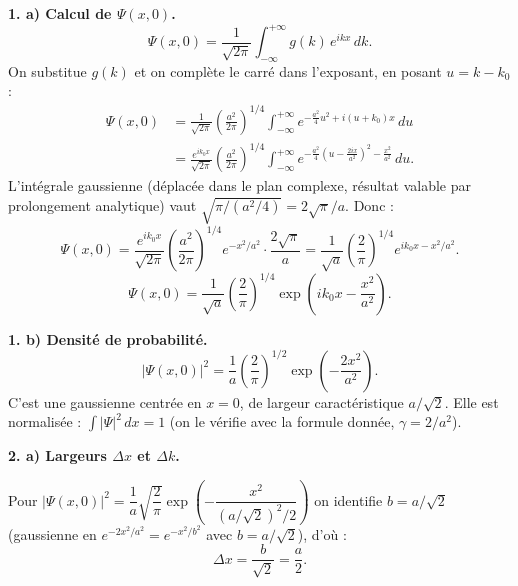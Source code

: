 \documentclass[12pt,a4paper]{article}
\begin{document}
\begin{boitecorrige}
\textbf{1. a) Calcul de $\Psi(x,0)$.}
\[
  \Psi(x,0) = \frac{1}{\sqrt{2\pi}}\int_{-\infty}^{+\infty}g(k)\,e^{ikx}\,dk.
\]
On substitue $g(k)$ et on complète le carré dans l'exposant, en posant $u = k-k_0$ :
\begin{align*}
  \Psi(x,0) &= \frac{1}{\sqrt{2\pi}}\left(\frac{a^2}{2\pi}\right)^{1/4}
               \int_{-\infty}^{+\infty}
               e^{-\frac{a^2}{4}u^2 + i(u+k_0)x}\,du\\
             &= \frac{e^{ik_0x}}{\sqrt{2\pi}}\left(\frac{a^2}{2\pi}\right)^{1/4}
               \int_{-\infty}^{+\infty}
               e^{-\frac{a^2}{4}\!\left(u - \frac{2ix}{a^2}\right)^2 - \frac{x^2}{a^2}}\,du.
\end{align*}
L'intégrale gaussienne (déplacée dans le plan complexe, résultat valable par prolongement
analytique) vaut $\sqrt{\pi/(a^2/4)} = 2\sqrt{\pi}/a$. Donc :
\[
  \Psi(x,0) = \frac{e^{ik_0x}}{\sqrt{2\pi}}\left(\frac{a^2}{2\pi}\right)^{1/4}
               e^{-x^2/a^2}\cdot\frac{2\sqrt{\pi}}{a}
            = \frac{1}{\sqrt{a}}\left(\frac{2}{\pi}\right)^{1/4}e^{ik_0x - x^2/a^2}.
\]
\[
  \boxed{\Psi(x,0) = \frac{1}{\sqrt{a}}\left(\frac{2}{\pi}\right)^{1/4}
         \exp\!\left(ik_0x - \frac{x^2}{a^2}\right).}
\]

\textbf{1. b) Densité de probabilité.}
\[
  |\Psi(x,0)|^2 = \frac{1}{a}\left(\frac{2}{\pi}\right)^{1/2}\exp\!\left(-\frac{2x^2}{a^2}\right).
\]
C'est une gaussienne centrée en $x=0$, de largeur caractéristique $a/\sqrt{2}$. Elle est
normalisée : $\int|\Psi|^2\,dx = 1$ (on le vérifie avec la formule donnée, $\gamma = 2/a^2$).

\begin{center}
\end{center}

\textbf{2. a) Largeurs $\Delta x$ et $\Delta k$.}

Pour $|\Psi(x,0)|^2 = \dfrac{1}{a}\sqrt{\dfrac{2}{\pi}}\exp\!\left(-\dfrac{x^2}{(a/\sqrt{2})^2/2}\right)$
on identifie $b = a/\sqrt{2}$ (gaussienne en $e^{-2x^2/a^2} = e^{-x^2/b^2}$ avec $b = a/\sqrt{2}$),
d'où :
\[
  \Delta x = \frac{b}{\sqrt{2}} = \frac{a}{2}.
\]


\end{boitecorrige}
\end{document}
